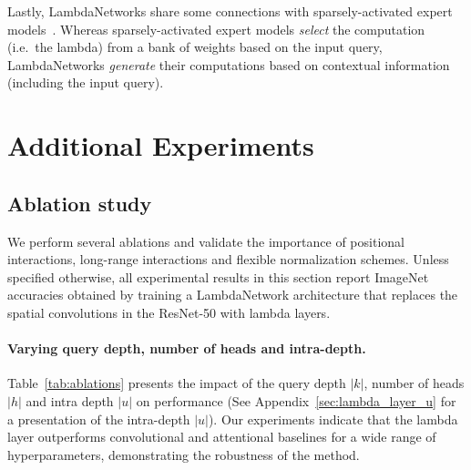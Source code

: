 \documentclass{article} \usepackage{iclr2021_conference,times}
\begin{document}
Lastly, LambdaNetworks share some connections with sparsely-activated expert models~\citep{shazeer2017outrageously,fedus2021switch}.
Whereas sparsely-activated expert models \emph{select} the computation (i.e.\ the lambda) from a bank of weights based on the input query, LambdaNetworks \emph{generate} their computations based on contextual information (including the input query).
 \newpage
\section{Additional Experiments\label{sec:additional_experiments}}

\subsection{Ablation study~\label{sec:additional_ablations}}
We perform several ablations and validate the importance of positional interactions, long-range interactions and flexible normalization schemes.
Unless specified otherwise, all experimental results in this section report ImageNet accuracies obtained by training a LambdaNetwork architecture that replaces the spatial convolutions in the ResNet-50 with lambda layers.

\vspace{-0.1cm}
\paragraph{Varying query depth, number of heads and intra-depth.\label{sec:kh_ablations}}
Table~\ref{tab:ablations} presents the impact of the query depth $|k|$, number of heads $|h|$ and intra depth $|u|$ on performance (See Appendix~\ref{sec:lambda_layer_u} for a presentation of the intra-depth $|u|$).
Our experiments indicate that the lambda layer outperforms convolutional and attentional baselines for a wide range of hyperparameters, demonstrating the robustness of the method.
\end{document}
